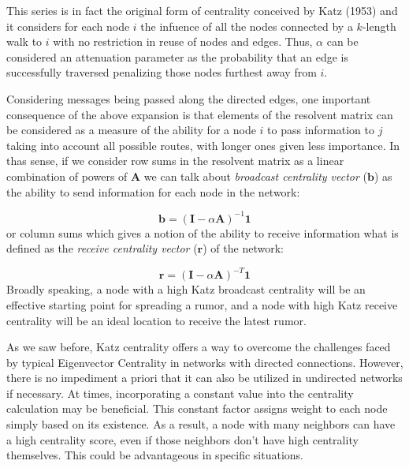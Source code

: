 This series is in fact the original form of centrality conceived by Katz (1953) and it considers for each node $i$ the infuence of all the nodes connected by a $k$-length walk to $i$ with no restriction in reuse of nodes and edges. Thus, $\alpha$ can be considered an attenuation parameter as the probability that an edge is successfully traversed penalizing those nodes furthest away from $i$. 

Considering messages being passed along the directed edges, one important consequence of the above expansion is that elements of the resolvent matrix can be considered as a measure of the ability for a node $i$ to pass information to $j$ taking into account all possible routes, with longer ones given less importance. In thas sense, if we consider row sums in the resolvent matrix as a linear combination of powers of $\mathbf{A}$ we can talk about \textit{broadcast centrality vector} ($\mathbf{b}$) as the ability to send information for each node in the network:  

\begin{equation}
\label{eqn:broad}
    \mathbf{b}=(\mathbf{I}-\alpha\mathbf{A})^{-1} \mathbf{1}
\end{equation}
or column sums which gives a notion of the ability to receive information what is defined as the \textit{receive centrality vector} ($\mathbf{r}$) of the network:

\begin{equation}
\label{eqn:receiv}
    \mathbf{r} = (\mathbf{I}-\alpha\mathbf{A})^{-T} \mathbf{1}
\end{equation}
Broadly speaking, a node with a high Katz broadcast centrality will be an effective starting point for spreading a rumor, and a node with high Katz receive centrality will be an ideal location to receive the latest rumor.

As we saw before, Katz centrality offers a way to overcome the challenges faced by typical Eigenvector Centrality in networks with directed connections. However, there is no impediment a priori that it can also be utilized in undirected networks if necessary. At times, incorporating a constant value into the centrality calculation may be beneficial. This constant factor assigns weight to each node simply based on its existence. As a result, a node with many neighbors can have a high centrality score, even if those neighbors don't have high centrality themselves. This could be advantageous in specific situations.

